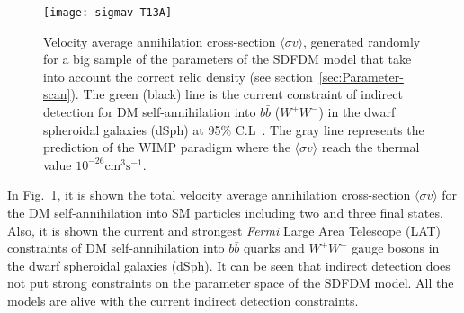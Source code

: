 \begin{figure}[h]
\begin{center}
\texttt{[image: sigmav-T13A]}
\end{center}
\caption{Velocity average annihilation cross-section $\langle\sigma v\rangle$, generated randomly for a big sample of the parameters of the SDFDM model that take into account the correct relic density (see section~\ref{sec:Parameter-scan}). The green (black) line is the current constraint of indirect detection for DM self-annihilation into $b\bar{b}$ ($W^+W^-$) in the dwarf spheroidal galaxies (dSph) at 95$\%$ C.L~\cite{Ackermann:2015zua}. The gray line represents the prediction of the WIMP paradigm where the $\langle\sigma v\rangle$ reach the thermal value $10^{-26}\text{cm}^{3}\text{s}^{-1}$.}
\label{fig:sigmav-random}
\end{figure}

In Fig.~\ref{fig:sigmav-random}, it is shown the total velocity average annihilation cross-section $\langle\sigma v\rangle$ for the DM self-annihilation into SM particles including two and three final states.
%
Also, it is shown the current and strongest \textit{Fermi}  Large Area Telescope (LAT)
constraints of DM self-annihilation into $b\bar{b}$ quarks and $W^+W^-$ gauge bosons in the dwarf spheroidal galaxies (dSph). It can be seen that indirect detection does not put strong constraints on the parameter space of the SDFDM model. All the models are alive with the current indirect detection constraints.    









